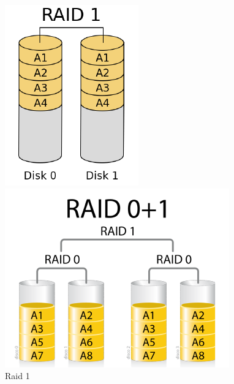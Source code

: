 \documentclass{article}
\begin{document}
\begin{itemize}
\begin{figure}[!htb]
  \includegraphics[width=\linewidth]{imgs/raid_1.png}
  \caption{Raid 1}\label{fig:raid_1}
\endminipage\hfill
{}
  \includegraphics[width=\linewidth]{imgs/raid_0+1.png}

\end{figure}
\end{itemize}
\end{document}
